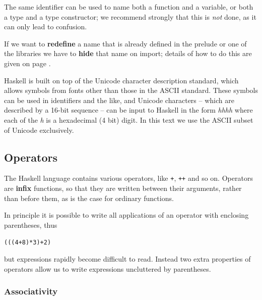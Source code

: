 The same identifier can be used to name both
a function and a variable, or both a type
and a type constructor; we recommend strongly that this is {\em not\/} done,
as it can only lead to confusion. 

If we want to \textbf{redefine} a name that is
already defined in the prelude or one of the libraries we have to \textbf{hide} that name on
import; details of how to do this are given on page \pageref{redefName}.

Haskell is built on top of the Unicode character
description standard, which allows symbols from fonts other than those
in the ASCII standard.
These symbols can be used in identifiers and the like, and
Unicode characters -- which are described by a 16-bit sequence -- can be input 
to Haskell in the form \texttt{}\textit{hhhh} where each of the \textit{h} is a
hexadecimal (4 bit) digit. In this text we use the ASCII subset of
Unicode exclusively. 

\subsection*{Operators}
\label{operators}

The Haskell language contains various operators, like \texttt{+}, \texttt{++} and
so on. Operators are \textbf{infix} functions, so that they are written between their
arguments, rather than before them, as is the case for ordinary functions. 

In principle it is possible to write all applications of an
operator with enclosing parentheses, thus
\begin{alltt}
(((4+8)*3)+2)
\end{alltt}
but expressions rapidly become difficult to read. Instead two extra
properties of operators allow us to write expressions uncluttered by
parentheses.

\subsubsection*{Associativity}

